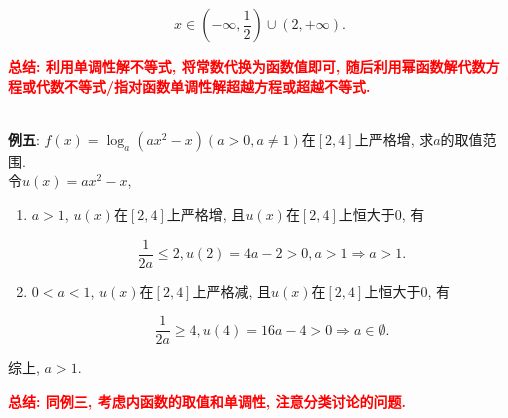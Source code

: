 \documentclass[8pt]{article}
\begin{document}
			$$x\in \left(-\infty, \frac{1}{2}\right) \cup (2, +\infty).$$

			\textbf{\textcolor{red}{总结: 利用单调性解不等式, 将常数代换为函数值即可, 随后利用幂函数解代数方程或代数不等式/指对函数单调性解超越方程或超越不等式.}}

		~\\

		\textbf{例五}: $f(x) = \log_{a} (ax^2 - x) (a>0, a\neq 1)$在$[2, 4]$上严格增, 求$a$的取值范围.
			~\\

			令$u(x) = ax^2 - x$,

			\begin{enumerate}[label=$\arabic*^{\circ}$]
				\item $a>1$, $u(x)$在$[2, 4]$上严格增, 且$u(x)$在$[2, 4]$上恒大于$0$, 有

					$$\frac{1}{2a} \leq 2, u(2) = 4a-2 > 0, a>1 \Rightarrow a>1.$$

				\item $0<a<1$, $u(x)$在$[2, 4]$上严格减, 且$u(x)$在$[2, 4]$上恒大于$0$, 有

					$$\frac{1}{2a} \geq 4, u(4) = 16a - 4 > 0 \Rightarrow a\in\emptyset.$$

			\end{enumerate}

			综上, $a>1$.

			\textbf{\textcolor{red}{总结: 同例三, 考虑内函数的取值和单调性, 注意分类讨论的问题.}}

		~\\
\end{document}
